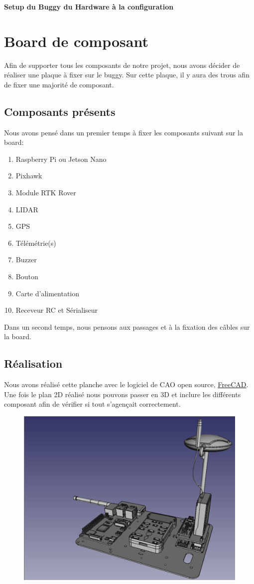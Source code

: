 \documentclass[a4paper, 10pt]{report}
\begin{document}
\begin{center}
\LARGE{\textbf{Setup du Buggy du Hardware à la configuration}}
\end{center}

\chapter{Board de composant}
Afin de supporter tous les composants de notre projet, 
nous avons décider de réaliser une plaque à fixer sur le buggy.
Sur cette plaque, il y aura des trous afin de fixer une majorité de composant.


\section{Composants présents}

Nous avons pensé dans un premier temps à fixer les composants suivant sur la board:
\begin{enumerate}
\item Raspberry Pi ou Jetson Nano
\item Pixhawk
\item Module RTK Rover
\item LIDAR
\item GPS 
\item Télémétrie(s)
\item Buzzer
\item Bouton
\item Carte d'alimentation
\item Receveur RC et Sérialiseur
\end{enumerate}
Dans un second temps, nous pensons aux passages et à la fixation des câbles sur la board.
\section{Réalisation}
Nous avons réalisé cette planche avec le logiciel de CAO open source, \href{freecad.org}{FreeCAD}. Une fois le plan 2D réalisé nous pouvons passer en 3D et inclure les différents composant afin de vérifier si tout s'agençait correctement.
\begin{figure}[!h]
\includegraphics[scale=0.5]{fig/vue1.png}
\end{figure}
\newpage
\end{document}
